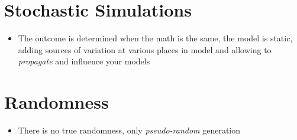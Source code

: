 \documentclass[12pt]{article}
\begin{document}
\section*{Stochastic Simulations}

\begin{itemize}
\item The outcome is determined when the math is the same, the model is static, adding sources of variation at various places in model and allowing to \emph{propagate} and influence your models
\end{itemize}

\section*{Randomness}
\begin{itemize}
\item There is no true randomness, only \emph{pseudo-random} generation
\end{itemize}
\end{document}
